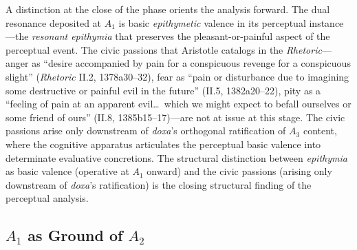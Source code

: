 A distinction at the close of the phase orients the analysis forward. The dual resonance deposited at $A_1$ is basic \textit{epithymetic} valence in its perceptual instance---the \textit{resonant epithymia} that preserves the pleasant-or-painful aspect of the perceptual event. The civic passions that Aristotle catalogs in the \textit{Rhetoric}---anger as ``desire accompanied by pain for a conspicuous revenge for a conspicuous slight'' (\textit{Rhetoric} II.2, 1378a30--32), fear as ``pain or disturbance due to imagining some destructive or painful evil in the future'' (II.5, 1382a20--22), pity as a ``feeling of pain at an apparent evil\ldots\ which we might expect to befall ourselves or some friend of ours'' (II.8, 1385b15--17)---are not at issue at this stage. The civic passions arise only downstream of \textit{doxa}'s orthogonal ratification of $A_3$ content, where the cognitive apparatus articulates the perceptual basic valence into determinate evaluative concretions. The structural distinction between \textit{epithymia} as basic valence (operative at $A_1$ onward) and the civic passions (arising only downstream of \textit{doxa}'s ratification) is the closing structural finding of the perceptual analysis.

\subsection{$A_1$ as Ground of $A_2$}

